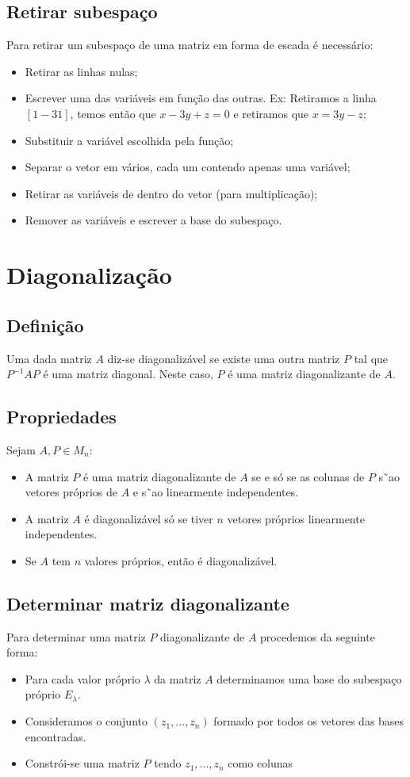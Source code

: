 \documentclass[10pt,a4paper]{report}
\begin{document}
\subsection{Retirar subespaço}
Para retirar um subespaço de uma matriz em forma de escada é necessário:
\begin{itemize}
\item Retirar as linhas nulas;
\item Escrever uma das variáveis em função das outras. Ex: Retiramos a linha $[1 -3 1]$, temos então que $x - 3y + z = 0$ e retiramos que $x = 3y - z$;
\item Substituir a variável escolhida pela função;
\item Separar o vetor em vários, cada um contendo apenas uma variável;
\item Retirar as variáveis de dentro do vetor (para multiplicação);
\item Remover as variáveis e escrever a base do subespaço.
\end{itemize}

\section{Diagonalização}
\subsection{Definição}
Uma dada matriz $A$ diz-se diagonalizável se existe uma outra matriz $P$ tal que $P^{-1}AP$ é uma matriz diagonal. Neste caso, $P$ é uma matriz diagonalizante de $A$.

\subsection{Propriedades}
Sejam $A, P \in M_n$:
\begin{itemize}
\item A matriz $P$ é uma matriz diagonalizante de $A$ se e só se as colunas
de $P$ s˜ao vetores próprios de $A$ e s˜ao linearmente independentes.
\item A matriz $A$ é diagonalizável só se tiver $n$ vetores próprios linearmente independentes.
\item Se $A$ tem $n$ valores próprios, então é diagonalizável.
\end{itemize}

\subsection{Determinar matriz diagonalizante}
Para determinar uma matriz $P$ diagonalizante de $A$ procedemos da seguinte forma:
\begin{itemize}
\item Para cada valor próprio $\lambda$ da matriz $A$ determinamos uma base do subespaço próprio $E_\lambda$.
\item Consideramos o conjunto $(z_1, ..., z_n)$ formado por todos os vetores das bases encontradas.
\item Constrói-se uma matriz $P$ tendo $z_1, ..., z_n$ como colunas
\end{itemize}
\end{document}
